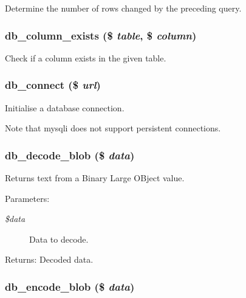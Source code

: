 Determine the number of rows changed by the preceding query. \hypertarget{database_8mysqli_8inc_3d649bb8d8b9a7222c0bded9d7e2785a}{
\subsubsection[{db\_\-column\_\-exists}]{\setlength{\rightskip}{0pt plus 5cm}db\_\-column\_\-exists (\$ {\em table}, \/  \$ {\em column})}}
\label{database_8mysqli_8inc_3d649bb8d8b9a7222c0bded9d7e2785a}


Check if a column exists in the given table. \hypertarget{database_8mysqli_8inc_bc9960ee403664deae1c219015dc5ff2}{
\subsubsection[{db\_\-connect}]{\setlength{\rightskip}{0pt plus 5cm}db\_\-connect (\$ {\em url})}}
\label{database_8mysqli_8inc_bc9960ee403664deae1c219015dc5ff2}


Initialise a database connection.

Note that mysqli does not support persistent connections. \hypertarget{database_8mysqli_8inc_1ed4215d202290ca055de8f6cf3b6f08}{
\subsubsection[{db\_\-decode\_\-blob}]{\setlength{\rightskip}{0pt plus 5cm}db\_\-decode\_\-blob (\$ {\em data})}}
\label{database_8mysqli_8inc_1ed4215d202290ca055de8f6cf3b6f08}


Returns text from a Binary Large OBject value.

\begin{Desc}
\item[Parameters:]
\begin{description}
\item[{\em \$data}]Data to decode. \end{description}
\end{Desc}
\begin{Desc}
\item[Returns:]Decoded data. \end{Desc}
\hypertarget{database_8mysqli_8inc_464ab7b26ecfdddc68f3564ca609ac3f}{
\subsubsection[{db\_\-encode\_\-blob}]{\setlength{\rightskip}{0pt plus 5cm}db\_\-encode\_\-blob (\$ {\em data})}}
\label{database_8mysqli_8inc_464ab7b26ecfdddc68f3564ca609ac3f}


